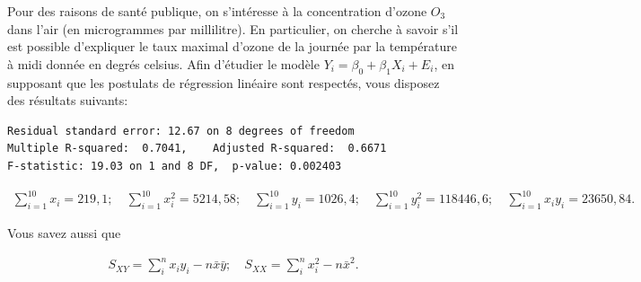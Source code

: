 \begin{questions}
\begin{itemize}[label={$\bullet$}]
\begin{tikzpicture}
\end{tikzpicture}
\end{itemize}



\newpage

\question\label{rls}
Pour des raisons de santé publique, on s'intéresse à la concentration d'ozone $O_3$ dans l'air (en microgrammes par millilitre). En particulier, on cherche à savoir s'il est possible d'expliquer le taux maximal d'ozone de la journée par la température à midi donnée en degrés celsius. Afin d'étudier le modèle $Y_i=\beta_0+\beta_1 X_i+ E_i$, en supposant que les postulats de régression linéaire sont respectés, vous disposez des résultats suivants:

\begin{verbatim}
Residual standard error: 12.67 on 8 degrees of freedom
Multiple R-squared:  0.7041,	Adjusted R-squared:  0.6671 
F-statistic: 19.03 on 1 and 8 DF,  p-value: 0.002403
\end{verbatim}

\begin{align*}
\sum_{i=1}^{10}x_i=219,1 ; \quad \sum_{i=1}^{10}x_i^2=5214,58;\quad \sum_{i=1}^{10}y_i=1026,4; \quad \sum_{i=1}^{10}y_i^2=118446,6;\quad \sum_{i=1}^{10}x_iy_i=23650,84.
\end{align*}

Vous savez aussi que 

\begin{align*}
    S_{XY} = \sum_{i}^nx_iy_i-n\bar{x}\bar{y}; \quad S_{XX}= \sum_{i}^nx_i^2-n\bar{x}^2.
\end{align*}
\end{questions}
